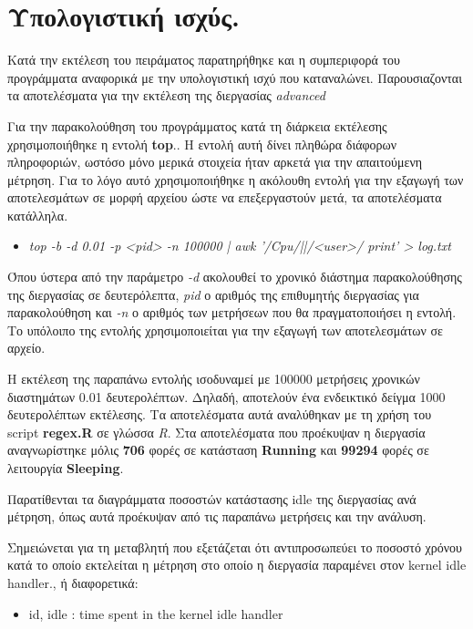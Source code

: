 \documentclass[12pt, a4paper]{article}
\begin{document}
\newpage

\section{Υπολογιστική ισχύς.}
Κατά την εκτέλεση του πειράματος παρατηρήθηκε και η συμπεριφορά του προγράμματα αναφορικά με την υπολογιστική ισχύ που καταναλώνει. Παρουσιαζονται τα αποτελέσματα για την εκτέλεση της διεργασίας \textlatin{\textit{advanced}}

\justify
Για την παρακολούθηση του προγράμματος κατά τη διάρκεια εκτέλεσης χρησιμοποιήθηκε η εντολή \textlatin{\textbf{top}}.\cite{manual}. Η εντολή αυτή δίνει πληθώρα διάφορων πληροφοριών, ωστόσο μόνο μερικά στοιχεία ήταν αρκετά για την απαιτούμενη μέτρηση. Για το λόγο αυτό χρησιμοποιήθηκε η ακόλουθη εντολή για την εξαγωγή των αποτελεσμάτων σε μορφή αρχείου ώστε να επεξεργαστούν μετά, τα αποτελέσματα κατάλληλα.
\begin{itemize}
    \item \textlatin{\textit{top -b -d 0.01 -p <pid> -n 100000 | awk '/Cpu/||/<user>/ {print}'      > log.txt}}
\end{itemize}
Όπου ύστερα από την παράμετρο \textlatin{\textit{-d}} ακολουθεί το χρονικό διάστημα παρακολούθησης της διεργασίας σε δευτερόλεπτα, \textlatin{\textit{pid}} ο αριθμός της επιθυμητής διεργασίας για παρακολούθηση και \textlatin{\textit{-n}} ο αριθμός των μετρήσεων που θα πραγματοποιήσει η εντολή. Το υπόλοιπο της εντολής χρησιμοποιείται για την εξαγωγή των αποτελεσμάτων σε αρχείο.

\justify 
Η εκτέλεση της παραπάνω εντολής ισοδυναμεί με 100000 μετρήσεις χρονικών διαστημάτων 0.01 δευτερολέπτων. Δηλαδή, αποτελούν ένα ενδεικτικό δείγμα 1000 δευτερολέπτων εκτέλεσης. Τα αποτελέσματα αυτά αναλύθηκαν με τη χρήση του \textlatin{script} \textlatin{\textbf{regex.R}} σε γλώσσα \textlatin{\textit{R}}. 
\justify
Στα αποτελέσματα που προέκυψαν η διεργασία αναγνωρίστηκε μόλις \textbf{706} φορές σε κατάσταση \textlatin{\textbf{Running}} και \textbf{99294} φορές σε λειτουργία \textlatin{\textbf{Sleeping}}. 

\justify
Παρατίθενται τα διαγράμματα ποσοστών κατάστασης \textlatin{idle} της διεργασίας ανά μέτρηση, όπως αυτά προέκυψαν από τις παραπάνω μετρήσεις και την ανάλυση. 

\justify
Σημειώνεται για τη μεταβλητή που εξετάζεται ότι αντιπροσωπεύει το ποσοστό χρόνου κατά το οποίο εκτελείται η μέτρηση στο οποίο η διεργασία παραμένει στον \textlatin{kernel idle handler}.\cite{manual}, ή διαφορετικά:
\begin{itemize}
    \item \textlatin{id, idle    : time spent in the kernel idle handler}\cite{manual}
\end{itemize}
\end{document}
